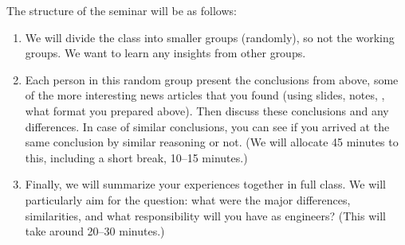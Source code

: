 The structure of the seminar will be as follows:
\begin{enumerate}
  \item We will divide the class into smaller groups (randomly), so not the 
    working groups.
    We want to learn any insights from other groups.

  \item Each person in this random group present the conclusions from above, 
    some of the more interesting news articles that you found (using slides, 
    notes, \etc, what format you prepared above).
    Then discuss these conclusions and any differences.
    In case of similar conclusions, you can see if you arrived at the same 
    conclusion by similar reasoning or not.
    (We will allocate 45 minutes to this, including a short break, 10--15 
    minutes.)

  \item Finally, we will summarize your experiences together in full class.
    We will particularly aim for the question: what were the major 
    differences, similarities, and what responsibility will you have as 
    engineers?
    (This will take around 20--30 minutes.)
\end{enumerate}




\begin{frame}[allowframebreaks]
  \printbibliography{}
\end{frame}
